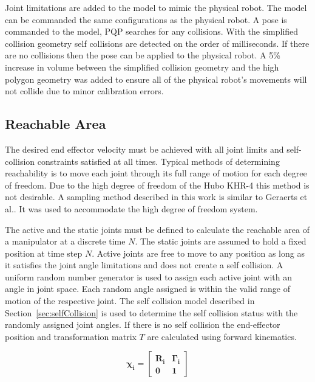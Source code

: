 Joint limitations are added to the model to mimic the physical robot.  The model can be commanded the same configurations as the physical robot.  A pose is commanded to the model, PQP searches for any collisions.  With the simplified collision geometry self collisions are detected on the order of milliseconds.  If there are no collisions then the pose can be applied to the physical robot.  A 5\% increase in volume between the simplified collision geometry and the high polygon geometry was added to ensure all of the physical robot's movements will not collide due to minor calibration errors.


\subsection{Reachable Area}\label{sec:rarea}
The desired end effector velocity must be achieved with all joint limits and self-collision constraints satisfied at all times. Typical methods of determining reachability is to move each joint through its full range of motion for each degree of freedom\cite{100034,springerlink:101007}. Due to the high degree of freedom of the Hubo KHR-4 this method is not desirable.  A sampling method described in this work is similar to Geraerts et al.\cite{1570152}.  It was used to accommodate the high degree of freedom system.

The active and the static joints must be defined to calculate the reachable area of a manipulator at a discrete time $N$.  The static joints are assumed to hold a fixed position at time step $N$.  Active joints are free to move to any position as long as it satisfies the joint angle limitations and does not create a self collision.  A uniform random number generator is used to assign each active joint with an angle in joint space.  Each random angle assigned is within the valid range of motion of the respective joint.  The self collision model described in Section~\ref{sec:selfCollision} is used to determine the self collision status with the randomly assigned joint angles.  If there is no self collision the end-effector position and transformation matrix $T$ are calculated using forward kinematics.

\begin{equation}\label{eq:fk1}
\mathbf{
\chi_i = \begin{bmatrix} R_{i} & \Gamma_{i} \\ 0 & 1 \end{bmatrix}
}
\end{equation}

